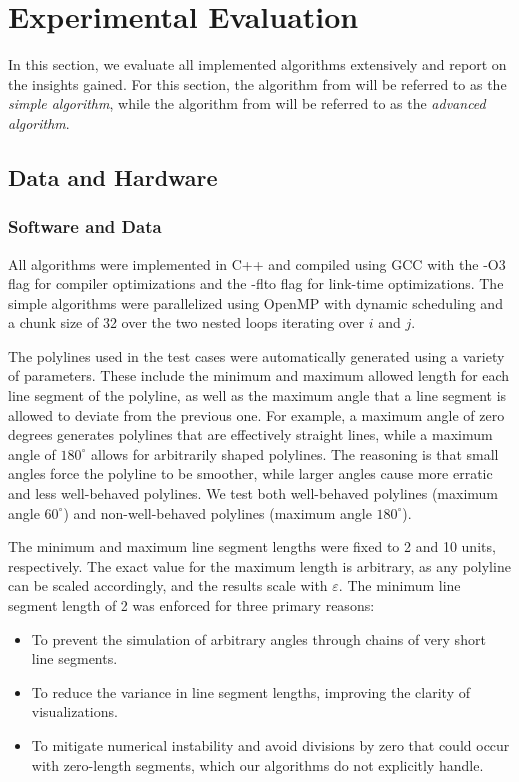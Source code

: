 \section{Experimental Evaluation}
\label{sec:evaluation}

In this section, we evaluate all implemented algorithms extensively and report on the insights gained. For this section, the algorithm from \citeauthor{on_optimal_polyline_simplification_using_the_hausdorff_and_frechet_distance} will be referred to as the \emph{simple algorithm}, while the algorithm from \citeauthor{polyline_simplification_has_cubic_complexity_bringmannetal} will be referred to as the \emph{advanced algorithm}.

\subsection{Data and Hardware}
\label{subsec:hardware}

\subsubsection{Software and Data}
\label{subsubsec:software}

All algorithms were implemented in C++ and compiled using GCC with the -O3 flag for compiler optimizations and the -flto flag for link-time optimizations. The simple algorithms were parallelized using OpenMP with dynamic scheduling and a chunk size of 32 over the two nested loops iterating over \(i\) and \(j\).

The polylines used in the test cases were automatically generated using a variety of parameters. These include the minimum and maximum allowed length for each line segment of the polyline, as well as the maximum angle that a line segment is allowed to deviate from the previous one. For example, a maximum angle of zero degrees generates polylines that are effectively straight lines, while a maximum angle of \(180^\circ\) allows for arbitrarily shaped polylines. The reasoning is that small angles force the polyline to be smoother, while larger angles cause more erratic and less well-behaved polylines. We test both well-behaved polylines (maximum angle \(60^\circ\)) and non-well-behaved polylines (maximum angle \(180^\circ\)).

The minimum and maximum line segment lengths were fixed to 2 and 10 units, respectively. The exact value for the maximum length is arbitrary, as any polyline can be scaled accordingly, and the results scale with \(\varepsilon\). The minimum line segment length of 2 was enforced for three primary reasons:
\begin{itemize}
	\item To prevent the simulation of arbitrary angles through chains of very short line segments.
	\item To reduce the variance in line segment lengths, improving the clarity of visualizations.
	\item To mitigate numerical instability and avoid divisions by zero that could occur with zero-length segments, which our algorithms do not explicitly handle.
\end{itemize}


